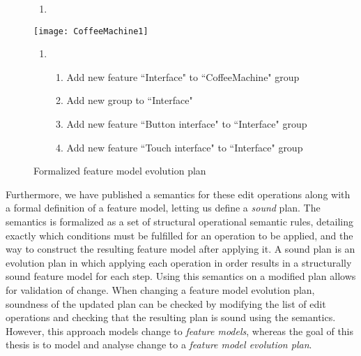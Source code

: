 \begin{figure}
   \footnotesize
   \begin{center}
      \begin{minipage}{0.98\textwidth}
         \begin{enumerate}[{\small $t_0$}]
            \item 
         \end{enumerate}
      \end{minipage}
      \texttt{[image: CoffeeMachine1]}
      \bigskip

      \begin{minipage}{0.98\textwidth}
         \begin{enumerate}[{\small $t_1$}]
            \item 
               \begin{enumerate}[ ]
                  \item Add new \mandatory{} feature ``Interface" to ``CoffeeMachine" \andtype{} group
                  \item Add new \xortype{} group to ``Interface"
                  \item Add new feature ``Button interface" to ``Interface" \xortype{} group
                  \item Add new feature ``Touch interface"  to ``Interface" \xortype{} group               \end{enumerate}
         \end{enumerate}
      \end{minipage}
      \caption{Formalized feature model evolution plan}
      \label{ex:formal-evolution-plan}
   \end{center}
\end{figure}

Furthermore, we have published a semantics for these edit operations along with a formal definition of a feature model, letting us define a \emph{sound} plan. The semantics is formalized as a set of structural operational semantic rules, detailing exactly which conditions must be fulfilled for an operation to be applied, and the way to construct the resulting feature model after applying it. A sound plan is an evolution plan in which applying each operation in order results in a structurally sound feature model for each step. Using this semantics on a modified plan allows for validation of change. When changing a feature model evolution plan, soundness of the updated plan can be checked by modifying the list of edit operations and checking that the resulting plan is sound using the semantics. However, this approach models change to \emph{feature models}, whereas the goal of this thesis is to model and analyse change to a \emph{feature model evolution plan}.

